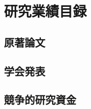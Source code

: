 \documentclass[a4j]{jsarticle}
\begin{document}
\section*{研究業績目録}
\begin{flushright}
  
\end{flushright}
\subsection*{原著論文}
\begin{enumerate}[leftmargin=*]
  
\end{enumerate}

\subsection*{学会発表}
\begin{enumerate}[leftmargin=*]
  
\end{enumerate}

\subsection*{競争的研究資金}
\begin{enumerate}[leftmargin=*]
  
\end{enumerate}
\end{document}
